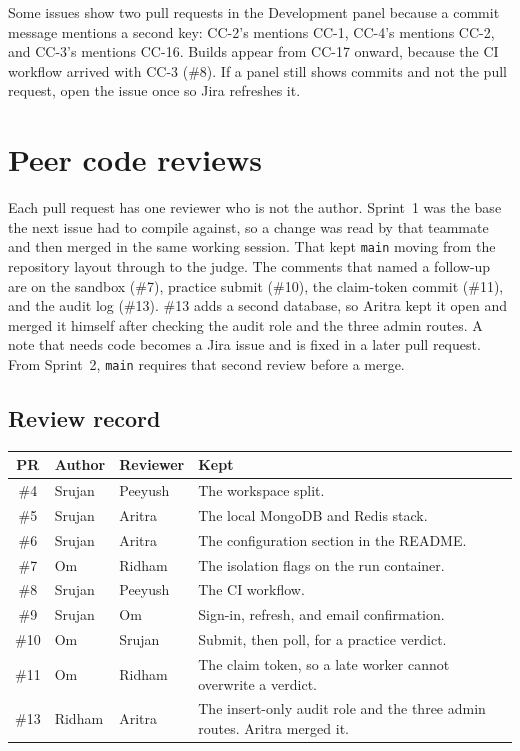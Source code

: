 \documentclass[11pt,a4paper]{article}
\begin{document}
Some issues show two pull requests in the Development panel because a commit message mentions a second key: CC-2's mentions CC-1, CC-4's mentions CC-2, and CC-3's mentions CC-16. Builds appear from CC-17 onward, because the CI workflow arrived with CC-3 (\#8). If a panel still shows commits and not the pull request, open the issue once so Jira refreshes it.

\section{Peer code reviews}

Each pull request has one reviewer who is not the author. Sprint~1 was the base the next issue had to compile against, so a change was read by that teammate and then merged in the same working session. That kept \texttt{main} moving from the repository layout through to the judge. The comments that named a follow-up are on the sandbox (\#7), practice submit (\#10), the claim-token commit (\#11), and the audit log (\#13). \#13 adds a second database, so Aritra kept it open and merged it himself after checking the audit role and the three admin routes. A note that needs code becomes a Jira issue and is fixed in a later pull request. From Sprint~2, \texttt{main} requires that second review before a merge.

\subsection{Review record}

\begin{center}
\small
\begin{tabularx}{\textwidth}{@{}c l l Y@{}}
\toprule
{} PR & Author & Reviewer & Kept \\
\midrule
\#4 & Srujan & Peeyush & The workspace split. \\
\#5 & Srujan & Aritra & The local MongoDB and Redis stack. \\
\#6 & Srujan & Aritra & The configuration section in the README. \\
\#7 & Om & Ridham & The isolation flags on the run container. \\
\#8 & Srujan & Peeyush & The CI workflow. \\
\#9 & Srujan & Om & Sign-in, refresh, and email confirmation. \\
\#10 & Om & Srujan & Submit, then poll, for a practice verdict. \\
\#11 & Om & Ridham & The claim token, so a late worker cannot overwrite a verdict. \\
\#13 & Ridham & Aritra & The insert-only audit role and the three admin routes. Aritra merged it. \\
\bottomrule
\end{tabularx}
\end{center}
\end{document}
